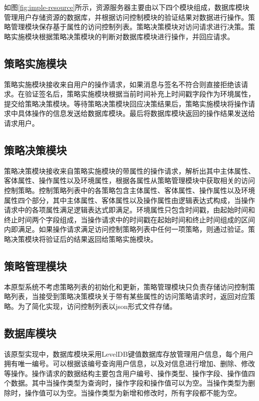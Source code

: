 如图\ref{fig:imple-resource}所示，资源服务器主要由以下四个模块组成，数据库模块管理用户存储资源的数据库，并根据访问控制模块的验证结果对数据进行操作。策略管理模块保存基于属性的访问控制列表。策略决策模块对访问请求进行决策。策略实施模块根据策略决策模块的判断对数据库模块进行操作，并回应请求。

\subsection{策略实施模块}

策略实施模块接收来自用户的操作请求，如果消息与签名不符合则直接拒绝该请求。在验证签名后，策略实施模块根据当前时间补充上时间戳字段作为环境属性，提交给策略决策模块。等待策略决策模块回应决策结果后，策略实施模块将操作请求中具体操作的信息发送给数据库模块。最后将数据库模块返回的操作结果发送给请求用户。

\subsection{策略决策模块}

策略决策模块接收来自策略实施模块的带属性的操作请求，解析出其中主体属性、客体属性、操作属性以及环境属性，根据各属性从策略管理模块中获取相关的访问控制策略。控制策略列表中的各策略包含主体属性、客体属性、操作属性以及环境属性四个部分，其中主体属性、客体属性以及操作属性由逻辑表达式构成，当操作请求中的各项属性满足逻辑表达式即满足。环境属性只包含时间戳，由起始时间和终止时间两个字段组成，当操作请求中的时间戳在起始时间和终止时间组成的区间内即满足。如果操作请求满足访问控制策略列表中任何一项策略，则通过验证。策略决策模块将验证后的结果返回给策略实施模块。

\subsection{策略管理模块}

本原型系统不考虑策略列表的初始化和更新，策略管理模块只负责存储访问控制策略列表，当接受到策略决策模块关于带有某些属性的访问策略请求时，返回对应策略。为了简化实现，访问控制列表以json形式文件存储。

\subsection{数据库模块}

该原型实现中，数据库模块采用LevelDB键值数据库存放管理用户信息，每个用户拥有唯一编号。可以根据该编号查询用户信息，以及对信息进行增加、删除、修改等操作。操作请求的数据结构主要包含用户编号、操作类型、操作字段、操作值四个数据。其中当操作类型为查询时，操作字段和操作值可以为空。当操作类型为删除时，操作值可以为空。当操作类型为新增和修改时，所有字段都不能为空。

